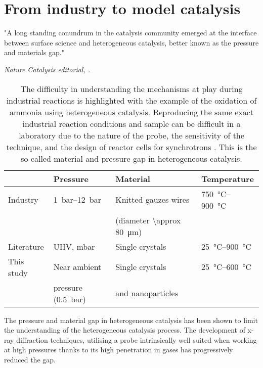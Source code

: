\section{From industry to model catalysis}\label{sec:LiteratureAmmonia}

\epigraph{"A long standing conundrum in the catalysis community emerged at the interface between surface science and heterogeneous catalysis, better known as the pressure and materials gap."}{\textit{Nature Catalysis editorial, \cite*{NatureEditorial2018}.}}

\begin{table}[!htb]
    \centering
    \begin{tabular}{l|l|l|l}
    \toprule
                & Pressure    & Material                         &     Temperature \\
    \midrule
    Industry   & \qtyrange{1}{12}{\bar} & Knitted gauzes wires   & \qtyrange{750}{900}{\degreeCelsius} \\
               &              & (diameter \qty{\approx 80}{\um}) & \\
    \midrule
    Literature & UHV, mbar    & Single crystals                  & \qtyrange{25}{900}{\degreeCelsius} \\
    \midrule
    This study & Near ambient & Single crystals                  & \qtyrange{25}{600}{\degreeCelsius} \\
               & pressure (\qty{0.5}{\bar})  & and nanoparticles & \\
    \bottomrule
    \end{tabular}
    \caption{
        The difficulty in understanding the mechanisms at play during industrial reactions is highlighted with the example of the oxidation of ammonia using heterogeneous catalysis.
        Reproducing the same exact industrial reaction conditions and sample can be difficult in a laboratory due to the nature of the probe, the sensitivity of the technique, and the design of reactor cells for synchrotrons \parencite{Hatscher2008}.
        This is the so-called material and pressure gap in heterogeneous catalysis.
    }
    \label{tab:Gap}
\end{table}

The pressure and material gap in heterogeneous catalysis has been shown to limit the understanding of the heterogeneous catalysis process.
The development of x-ray diffraction techniques, utilising a probe intrinsically well suited when working at high pressures thanks to its high penetration in gases has progressively reduced the gap.

